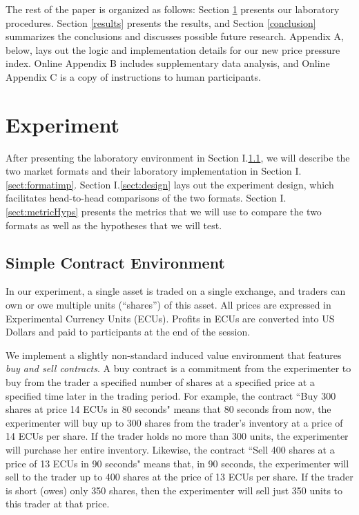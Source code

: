 \documentclass[12pt]{article}
\begin{document}
The rest of the paper is organized as follows: Section \ref{Experiment} presents our laboratory procedures. Section \ref{results} presents the results, and Section \ref{conclusion} summarizes the conclusions and discusses possible future research. 
Appendix A, below, lays out the logic and implementation details for our new price pressure index.
Online Appendix B includes supplementary data analysis, and Online Appendix C is a copy of instructions to human participants.




\section{Experiment}
\label{Experiment}

After presenting the laboratory environment in Section I.\ref{sect:contracts}, we will describe the two market formats and their laboratory implementation in Section I.\ref{sect:formatimp}.
Section I.\ref{sect:design} lays out the experiment design, which facilitates head-to-head comparisons of the two formats. 
Section I.\ref{sect:metricHyps} presents the metrics that we will use to compare the two formats as well as the hypotheses that we will test.
\subsection{Simple Contract Environment}\label{sect:contracts}

In our experiment, a single asset is traded on a single exchange, and traders can own or owe multiple units (``shares'') of this asset. All prices are expressed in Experimental Currency Units (ECUs).
Profits in ECUs are converted into US Dollars and paid to participants at the end of the session.

We implement a slightly non-standard induced value environment that features  \textit{buy and sell contracts}. 
A buy contract is a commitment from the experimenter to buy from the trader a specified number of shares at a specified price at a specified time later in the trading period. 
For example, the contract ``Buy 300 shares at price  14 ECUs in 80 seconds" means that 80 seconds from now, the experimenter will buy up to 300 shares from the trader's inventory at a price of 14 ECUs per share. If the trader holds no more than 300 units, the experimenter will purchase her entire inventory. 
Likewise, the contract ``Sell 400 shares at a price of 13 ECUs in 90 seconds" means that, in 90 seconds, the experimenter will sell to the trader up to 400 shares at the price of 13 ECUs per share. If the trader is short (owes) only 350 shares, then the experimenter will sell just 350 units to this trader at that price. 
\end{document}
